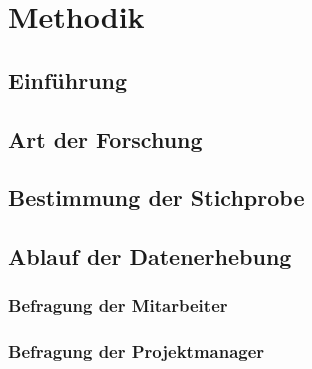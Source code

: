
\chapter{Methodik}
\label{ch:methodik}

\section{Einführung}

\section{Art der Forschung}

\section{Bestimmung der Stichprobe}

\section{Ablauf der Datenerhebung}

\subsection{Befragung der Mitarbeiter}

\subsection{Befragung der Projektmanager}

